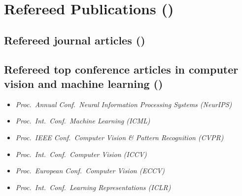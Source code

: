 \documentclass[9pt, a4paper]{article}
\begin{document}


\section*{Refereed Publications (\unskip)}

\subsection*{Refereed journal articles (\unskip)}
\noindent








\vspace{-0.15cm}
\subsection*{Refereed top conference articles in computer vision and machine learning (\unskip)
}
{
\begin{itemize}
  \itemsep -.12cm
\footnotesize
\item \emph{  Proc.\ Annual Conf.\ Neural Information Processing Systems (NeurIPS)}
\item \emph{  Proc.\ Int.\ Conf.\ Machine Learning (ICML)}
\item \emph{  Proc.\ IEEE Conf.\ Computer Vision \& Pattern Recognition (CVPR)}
\item \emph{  Proc.\ Int.\ Conf.\ Computer  Vision (ICCV)}
\item \emph{  Proc.\ European Conf.\ Computer Vision (ECCV)}
\item \emph{  Proc.\ Int.\ Conf.\ Learning Representations (ICLR)} 

\end{itemize}
}


\noindent









\vspace{-0.15cm}
\end{document}
